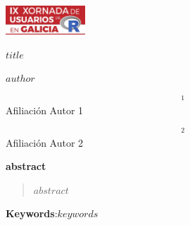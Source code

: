 \begin{flushright}
    \includegraphics[angle=0,keepaspectratio,width=3cm]{logo.pdf}
    \end{flushright}
     \vspace{20pt}
    
    \begin{center}
        \textbf{$title$}
        
        \vspace{0.15cm}
        
        $author$ 
        \end{center}
        
        \vspace{0.06cm}
        
        $$^{1}$$Afiliaci\'on Autor 1
        
        $$^{2}$$Afiliaci\'on Autor 2
        
        \begin{center}
        \textbf{abstract}
        \end{center}
        
        \begin{quotation}
        \noindent $abstract$
        \end{quotation}
        
        \vspace{0.4cm}
        
        \textbf{Keywords}:$keywords$
        
        \vspace{0.4cm}
